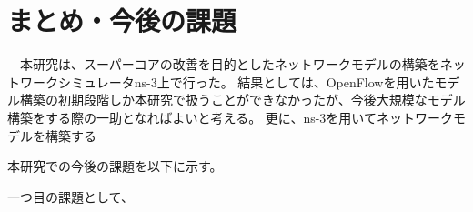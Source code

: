 \chapter{まとめ・今後の課題}

　本研究は、スーパーコアの改善を目的としたネットワークモデルの構築をネットワークシミュレータns-3上で行った。
結果としては、OpenFlowを用いたモデル構築の初期段階しか本研究で扱うことができなかったが、今後大規模なモデル構築をする際の一助となればよいと考える。
更に、ns-3を用いてネットワークモデルを構築する

本研究での今後の課題を以下に示す。

一つ目の課題として、